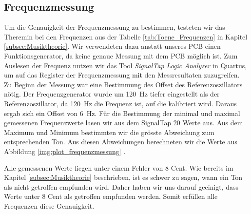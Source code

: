 \subsection{Frequenzmessung}\label{subsec:Frequenzmessung}
Um die Genauigkeit der Frequenzmessung zu bestimmen, testeten wir das Theremin bei den  Frequenzen aus der Tabelle \ref{tab:Toene_Frequenzen} in Kapitel \ref{subsec:Musiktheorie}.
 Wir verwendeten dazu anstatt unseres PCB einen Funktionsgenerator, da keine genaue Messung mit dem PCB möglich ist. Zum Auslesen der Frequenz nutzen wir das Tool \textit{SignalTap Logic Analyzer} in Quartus, um auf das Register der Frequenzmessung mit den Messresultaten zuzugreifen.
 Zu Beginn der Messung war eine Bestimmung des Offset des Referenzoszillators nötig. Der Frequenzgenerator wurde um \SI{120}{Hz} tiefer eingestellt als der Referenzoszillator, da \SI{120}{Hz} die Frequenz ist, auf die kalibriert wird. Daraus ergab sich ein Offset von  \SI{6}{Hz}.
 Für die Bestimmung der minimal und maximal gemessenen Frequenzwerte lasen wir aus dem SignalTap 20 Werte aus. Aus dem Maximum und Minimum bestimmten wir die grösste Abweichung zum entsprechenden Ton. Aus diesen Abweichungen berechneten wir die Werte aus Abbildung \ref{img:plot_frequenzmessung} .

 Alle gemessenen Werte liegen unter einem Fehler von 8 Cent. Wie bereits im Kapitel \ref{subsec:Musiktheorie} beschrieben, ist es schwer zu sagen, wann ein Ton als \glqq nicht getroffen\grqq{} empfunden wird. Daher haben wir uns darauf geeinigt, dass Werte unter 8 Cent als \glqq getroffen\grqq{} empfunden werden. Somit erfüllen alle Frequenzen diese Genauigkeit.
 
